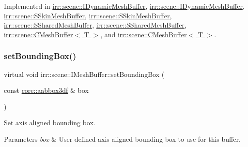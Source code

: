 Implemented in \hyperlink{classirr_1_1scene_1_1IDynamicMeshBuffer_a449643505823c7cfe793c5a82cde5fa4}{irr\+::scene\+::\+I\+Dynamic\+Mesh\+Buffer}, \hyperlink{classirr_1_1scene_1_1IDynamicMeshBuffer_a449643505823c7cfe793c5a82cde5fa4}{irr\+::scene\+::\+I\+Dynamic\+Mesh\+Buffer}, \hyperlink{structirr_1_1scene_1_1SSkinMeshBuffer_af9671765c9d6be2b6d99878e1bdb1b9d}{irr\+::scene\+::\+S\+Skin\+Mesh\+Buffer}, \hyperlink{structirr_1_1scene_1_1SSkinMeshBuffer_af9671765c9d6be2b6d99878e1bdb1b9d}{irr\+::scene\+::\+S\+Skin\+Mesh\+Buffer}, \hyperlink{structirr_1_1scene_1_1SSharedMeshBuffer_a43d93dd17ede5931189376c1518ee501}{irr\+::scene\+::\+S\+Shared\+Mesh\+Buffer}, \hyperlink{structirr_1_1scene_1_1SSharedMeshBuffer_a43d93dd17ede5931189376c1518ee501}{irr\+::scene\+::\+S\+Shared\+Mesh\+Buffer}, \hyperlink{classirr_1_1scene_1_1CMeshBuffer_a9173c9d0c6f32890ab75dc501aaf5be6}{irr\+::scene\+::\+C\+Mesh\+Buffer$<$ T $>$}, and \hyperlink{classirr_1_1scene_1_1CMeshBuffer_a9173c9d0c6f32890ab75dc501aaf5be6}{irr\+::scene\+::\+C\+Mesh\+Buffer$<$ T $>$}.

\mbox{\label{classirr_1_1scene_1_1IMeshBuffer_adbbfb7757dfbba7357193d2280893df6}} 
\subsubsection{\texorpdfstring{set\+Bounding\+Box()}{setBoundingBox()}\hspace{0.1cm}{\footnotesize\ttfamily [1/2]}}
{\footnotesize\ttfamily virtual void irr\+::scene\+::\+I\+Mesh\+Buffer\+::set\+Bounding\+Box (\begin{DoxyParamCaption}\item[{const \hyperlink{namespaceirr_1_1core_a60f4b4c744aba55f10530d503c6ecb04}{core\+::aabbox3df} \&}]{box }\end{DoxyParamCaption})\hspace{0.3cm}{\ttfamily [pure virtual]}}



Set axis aligned bounding box. 


\begin{DoxyParams}{Parameters}
{\em box} & User defined axis aligned bounding box to use for this buffer. \\
\hline
\end{DoxyParams}


